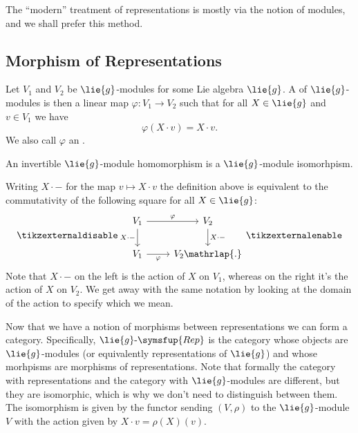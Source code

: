 \documentclass[fleqn]{NotesClass}
\makeatletter
\newcommand{\c@egory}[1]{\symsfup{#1}}
\newcommand{\Rep}[1][\lie{g}]{#1\text{-}\c@egory{Rep}}
\makeatother
\begin{document}
    The \enquote{modern} treatment of representations is mostly via the notion of modules, and we shall prefer this method.
    
    \subsection{Morphism of Representations}
    \begin{dfn}{}{}
        Let \(V_1\) and \(V_2\) be \(\lie{g}\)-modules for some Lie algebra \(\lie{g}\).
        A  of \(\lie{g}\)-modules is then a linear map \(\varphi \colon V_1 \to V_2\) such that for all \(X \in \lie{g}\) and \(v \in V_1\) we have
        \begin{equation}
            \varphi(X \cdot v) = X \cdot v.
        \end{equation}
        We also call \(\varphi\) an .
        
        An invertible \(\lie{g}\)-module homomorphism is a \(\lie{g}\)-module isomorhpism.
    \end{dfn}
    
    Writing \(X \cdot {-}\) for the map \(v \mapsto X \cdot v\) the definition above is equivalent to the commutativity of the following square for all \(X \in \lie{g}\):
    \begin{equation}
        \tikzexternaldisable
        \begin{tikzcd}
            V_1 \arrow[r, "\varphi"] \arrow[d, "X \cdot {-}"'] & V_2 \arrow[d, "X \cdot {-}"]\\
            V_1 \arrow[r, "\varphi"'] & V_2\mathrlap{.}
        \end{tikzcd}
        \tikzexternalenable
    \end{equation}
    Note that \(X \cdot {-}\) on the left is the action of \(X\) on \(V_1\), whereas on the right it's the action of \(X\) on \(V_2\).
    We get away with the same notation by looking at the domain of the action to specify which we mean.
    
    Now that we have a notion of morphisms between representations we can form a category.
    Specifically, \(\Rep\) is the category whose objects are \(\lie{g}\)-modules (or equivalently representations of \(\lie{g}\)) and whose morhpisms are morphisms of representations.
    Note that formally the category with representations and the category with \(\lie{g}\)-modules are different, but they are isomorphic, which is why we don't need to distinguish between them.
    The isomorphism is given by the functor sending \((V, \rho)\) to the \(\lie{g}\)-module \(V\) with the action given by \(X \cdot v = \rho(X)(v)\).
    
\end{document}
